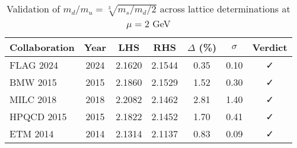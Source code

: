 
\begin{table}[h]
\centering
\caption{Validation of $m_d/m_u = \sqrt[3]{m_s/m_d / 2}$ across lattice determinations at $\mu = 2$ GeV}
\begin{tabular}{lcccccc}
\hline
Collaboration & Year & LHS & RHS & $\Delta$ (\%) & $\sigma$ & Verdict \\
\hline
FLAG 2024 & 2024 & 2.1620 & 2.1544 & 0.35 & 0.10 & ✓ \\
BMW 2015 & 2015 & 2.1860 & 2.1529 & 1.52 & 0.30 & ✓ \\
MILC 2018 & 2018 & 2.2082 & 2.1462 & 2.81 & 1.40 & ✓ \\
HPQCD 2015 & 2015 & 2.1822 & 2.1452 & 1.70 & 0.41 & ✓ \\
ETM 2014 & 2014 & 2.1314 & 2.1137 & 0.83 & 0.09 & ✓ \\
\hline
\end{tabular}
\label{tab:cube_root_validation}
\end{table}